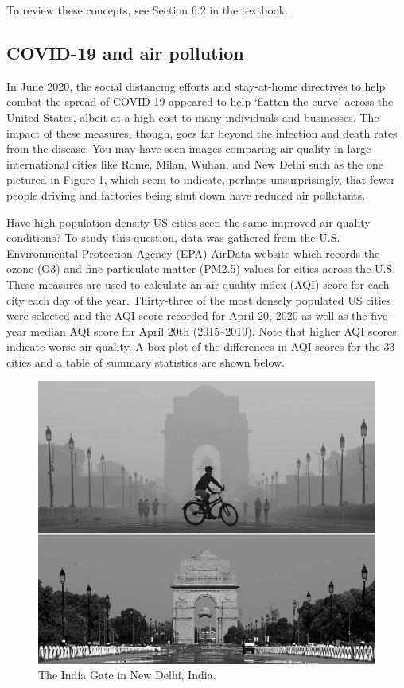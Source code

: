 \documentclass[
]{report}
\begin{document}
To review these concepts, see Section 6.2 in the textbook.

\hypertarget{covid-19-and-air-pollution}{%
\subsection{COVID-19 and air pollution}\label{covid-19-and-air-pollution}}

In June 2020, the social distancing efforts and stay-at-home directives to help combat the spread of COVID-19 appeared to help `flatten the curve' across the United States, albeit at a high cost to many individuals and businesses. The impact of these measures, though, goes far beyond the infection and death rates from the disease. You may have seen images comparing air quality in large international cities like Rome, Milan, Wuhan, and New Delhi such as the one pictured in Figure \ref{fig:covid}, which seem to indicate, perhaps unsurprisingly, that fewer people driving and factories being shut down have reduced air pollutants.

Have high population-density US cities seen the same improved air quality conditions? To study this question, data was gathered from the U.S. Environmental Protection Agency (EPA) AirData website which records the ozone (O3) and fine particulate matter (PM2.5) values for cities across the U.S. These measures are used to calculate an air quality index (AQI) score for each city each day of the year. Thirty-three of the most densely populated US cities were selected and the AQI score recorded for April 20, 2020 as well as the five-year median AQI score for April 20th (2015--2019). Note that higher AQI scores indicate worse air quality. A box plot of the differences in AQI scores for the 33 cities and a table of summary statistics are shown below.

\begin{figure}

{\centering \includegraphics[width=0.6\linewidth]{images/air_pollution_greyscale} 

}

\caption{The India Gate in New Delhi, India.}\label{fig:covid}
\end{figure}
\end{document}
